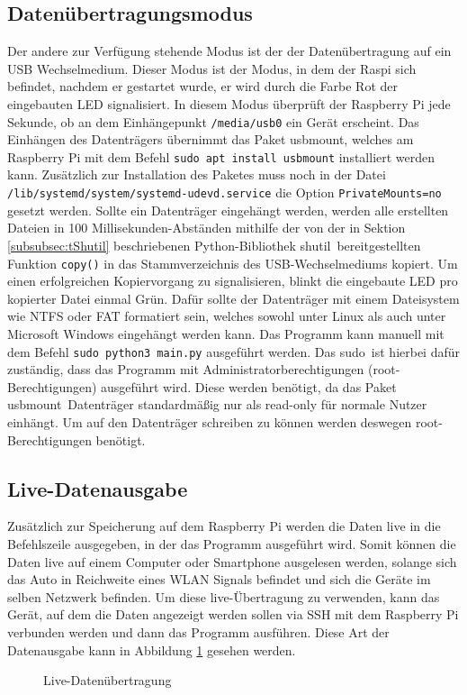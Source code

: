 \subsection{Datenübertragungsmodus}
\label{subsec:Datenübertragungsmodus}
Der andere zur Verfügung stehende Modus ist der der Datenübertragung auf ein \ac{USB} Wechselmedium. Dieser Modus ist der Modus, in dem der \ac{Raspi} sich befindet, nachdem er gestartet wurde, er wird durch die Farbe Rot der eingebauten \ac{LED} signalisiert. In diesem Modus überprüft der Raspberry Pi jede Sekunde, ob an dem Einhängepunkt \verb|/media/usb0| ein Gerät erscheint. Das Einhängen des Datenträgers übernimmt das Paket \glqq usbmount\grqq , welches am Raspberry Pi mit dem Befehl \verb|sudo apt install usbmount| installiert werden kann. Zusätzlich zur Installation des Paketes muss noch in der Datei \verb|/lib/systemd/system/systemd-udevd.service| die Option \verb|PrivateMounts=no| gesetzt werden. Sollte ein Datenträger eingehängt werden, werden alle erstellten Dateien in 100 Millisekunden-Abständen mithilfe der von der in Sektion \ref{subsubsec:tShutil} beschriebenen Python-Bibliothek \glqq shutil\grqq\ bereitgestellten Funktion \verb|copy()| in das Stammverzeichnis des \ac{USB}-Wechselmediums kopiert. Um einen erfolgreichen Kopiervorgang zu signalisieren, blinkt die eingebaute \ac{LED} pro kopierter Datei einmal Grün. Dafür sollte der Datenträger mit einem Dateisystem wie \ac{NTFS} oder \ac{FAT} formatiert sein, welches sowohl unter Linux als auch unter Microsoft Windows eingehängt werden kann. Das Programm kann manuell mit dem Befehl \verb|sudo python3 main.py| ausgeführt werden. Das \glqq sudo\grqq\ ist hierbei dafür zuständig, dass das Programm mit Administratorberechtigungen (root-Berechtigungen) ausgeführt wird. Diese werden benötigt, da das Paket \glqq usbmount\grqq\ Datenträger standardmäßig nur als read-only für normale Nutzer einhängt. Um auf den Datenträger schreiben zu können werden deswegen root-Berechtigungen benötigt.
\subsection{Live-Datenausgabe}
\label{subsec:LiveDatenausgabe}
Zusätzlich zur Speicherung auf dem Raspberry Pi werden die Daten live in die Befehlszeile ausgegeben, in der das Programm ausgeführt wird. Somit können die Daten live auf einem Computer oder Smartphone ausgelesen werden, solange sich das Auto in Reichweite eines \ac{WLAN} Signals befindet und sich die Geräte im selben Netzwerk befinden. Um diese live-Übertragung zu verwenden, kann das Gerät, auf dem die Daten angezeigt werden sollen via \ac{SSH} mit dem Raspberry Pi verbunden werden und dann das Programm ausführen. Diese Art der Datenausgabe kann in Abbildung \ref{fig:liveDaten} gesehen werden.
\begin{figure}[h]
\centering
\missingfigure{}
\caption{Live-Datenübertragung}
\label{fig:liveDaten}
\end{figure}